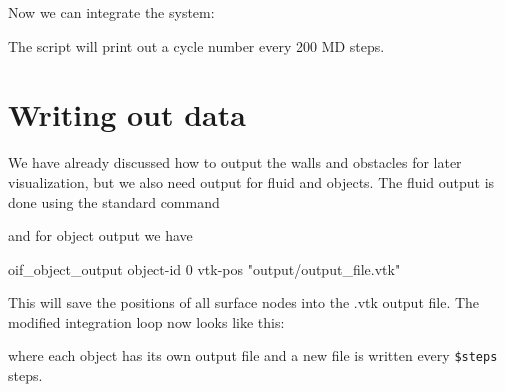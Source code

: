 \documentclass[
a4paper,                        %
11pt,                           %
twoside,                        %
footsepline,                    %
headsepline,                    %
headexclude,                    %
footexclude,                    %
pagesize,                       %
]{scrartcl}
\begin{document}
Now we can integrate the system:\\
 \vspace{0 mm}
 
The script will print out a cycle number every 200 MD steps.
 
\section{Writing out data}

We have already discussed how to output the walls and obstacles for later visualization, but we also need output for fluid and objects. The fluid output is done using the standard \es command\\ 
 \vspace{0 mm}
 
 and for object output we have\\ 
 \begin{tclcode}
  oif_object_output object-id 0 vtk-pos "output/output_file.vtk"
  \end{tclcode}
  \vspace{0 mm}
  
This will save the positions of all surface nodes into the .vtk output file. The modified integration loop now looks like this:\\
 \vspace{0 mm}
 
 where each object has its own output file and a new file is written every \verb|$steps| steps.
\end{document}
